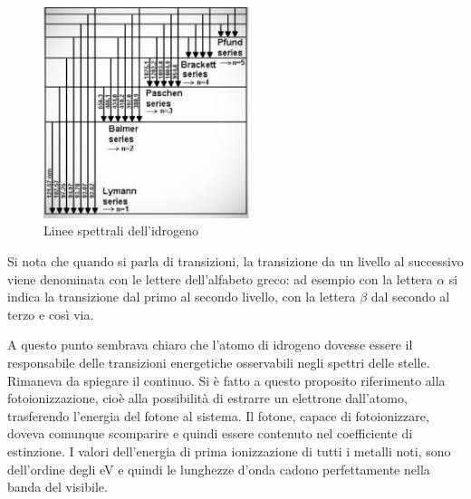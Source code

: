 \documentclass[a4paper,11pt]{article}
\begin{document}
     \begin{figure}[h!!]
        \centering
        \includegraphics[width=6cm]{hydrogen_spectral_lines.jpg}
        \caption{Linee spettrali dell'idrogeno}
        \label{fig: hydrogen spectral lines}
    \end{figure}
    
    Si nota che quando si parla di transizioni, la transizione da un livello al successivo viene denominata con le lettere dell'alfabeto greco: ad esempio con la lettera ${\alpha}$ si indica la transizione dal primo al secondo livello, con la lettera ${\beta}$ dal secondo al terzo e così via. 
    
    A questo punto sembrava chiaro che l'atomo di idrogeno dovesse essere il responsabile delle transizioni energetiche osservabili negli spettri delle stelle. Rimaneva da spiegare il continuo. Si è fatto a questo proposito riferimento alla fotoionizzazione, cioè alla possibilità di estrarre un elettrone dall'atomo, trasferendo l'energia del fotone al sistema. Il fotone, capace di fotoionizzare, doveva comunque scomparire e quindi essere contenuto nel coefficiente di estinzione.
    I valori dell'energia di prima ionizzazione di tutti i metalli noti, sono dell'ordine degli eV e quindi le lunghezze d'onda cadono perfettamente nella banda del visibile. 
\end{document}
